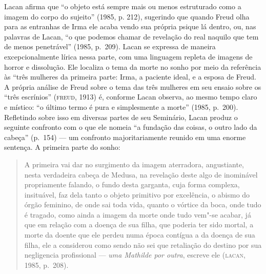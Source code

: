 Lacan afirma que ``o objeto está sempre mais ou menos estruturado como a
imagem do corpo do sujeito'' (1985, p. 212), sugerindo que quando
Freud olha para as entranhas de Irma ele acaba vendo sua própria psique
lá dentro, ou, nas palavras de Lacan, ``o que podemos
chamar de revelação do real naquilo que tem de menos penetrável'' (1985, p.~209).
Lacan se expressa de maneira excepcionalmente lírica nessa parte,
com uma linguagem repleta de imagens de horror e dissolução. Ele
localiza o tema da morte no sonho por meio da referência às ``três
mulheres da primeira parte: Irma, a paciente ideal, e a esposa de Freud.
A própria análise de Freud sobre o tema das três mulheres em seu ensaio
sobre os ``três escrínios'' (\textsc{freud}, 1913) é, conforme Lacan observa, ao
mesmo tempo claro e místico: ``o último termo é pura e simplesmente a
morte'' (1985, p.~200). Refletindo sobre isso em diversas
partes de seu Seminário, Lacan produz o seguinte confronto com o que ele
nomeia ``a fundação das coisas, o outro lado da cabeça'' (p.~154) --- um
confronto majoritariamente reunido em uma enorme sentença. A primeira
parte do sonho:

\begin{quote}
A primeira vai dar no surgimento da imagem aterradora, angustiante,
nesta verdadeira cabeça de Medusa, na revelação deste algo de inominável
propriamente falando, o fundo desta garganta, cuja forma complexa,
insituável, faz dela tanto o objeto primitivo por excelência, o abismo
do órgão feminino, de onde sai toda vida, quanto o vórtice da boca, onde
tudo é tragado, como ainda a imagem da morte onde tudo vem"-se acabar, já
que em relação com a doença de sua filha, que poderia ter sido mortal, a
morte da doente que ele perdeu numa época contígua a da doença de sua
filha, ele a considerou como sendo não sei que retaliação do destino por
sua negligencia profissional --- \emph{uma Mathilde por outra}, escreve
ele (\textsc{lacan}, 1985, p.~208).
\end{quote}

